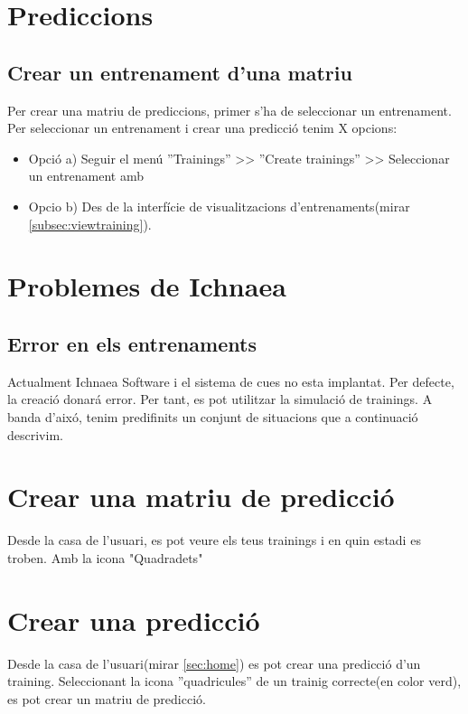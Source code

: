 \section{Prediccions}
\subsection{Crear un entrenament d'una matriu}
Per crear una matriu de prediccions, primer s'ha de seleccionar un entrenament. Per seleccionar un entrenament i crear una predicció tenim X opcions:
\begin{itemize}
\item Opció a) Seguir el menú ''Trainings'' >> ''Create trainings'' >> Seleccionar un entrenament amb \icontableninesquares
\item Opcio b) Des de la interfície de visualitzacions d'entrenaments(mirar \ref{subsec:viewtraining}).
\end{itemize}

\section{Problemes de Ichnaea}
\label{sec:ichnaeaErrors}
\subsection{Error en els entrenaments}

Actualment Ichnaea Software i el sistema de cues no esta implantat. Per defecte, la creaci\'{o} donar\'{a} error. Per tant, es pot utilitzar la simulaci\'{o} de trainings.
A banda d'aix\'{o}, tenim predifinits un conjunt de situacions que a continuaci\'{o} descrivim.

\section{Crear una matriu de predicci\'{o}}
Desde la casa de l'usuari, es pot veure els teus trainings i en quin estadi es troben. Amb la icona "Quadradets"

\section{Crear una predicci\'{o}}
Desde la casa de l'usuari(mirar \ref{sec:home}) es pot crear una predicci\'{o} d'un training. Seleccionant la icona ''quadricules'' de un trainig correcte(en color verd), es pot crear un matriu de predicci\'{o}.

